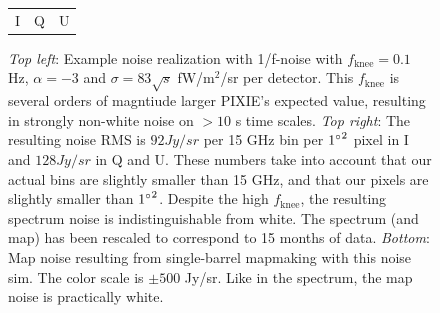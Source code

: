 \documentclass{article}
\begin{document}
\begin{figure}
\begin{tabular}{m{56mm}m{54.4mm}m{56mm}}
		\hspace{32mm}I & \hspace{32mm}Q & \hspace{32mm}U
	\end{tabular}
	\caption{\emph{Top left}: Example noise realization with 1/f-noise with
		$f_\textrm{knee} = 0.1$ Hz, $\alpha=-3$ and $\sigma = 83 \sqrt{s}$
		fW/$\textrm{m}^2$/sr per detector. This $f_\textrm{knee}$ is
		several orders of magntiude larger PIXIE's expected value,
		resulting in strongly non-white noise on $>10$ s time scales.
		\emph{Top right}: The resulting noise RMS is $92 Jy/sr$ per 15 GHz
		bin per ${1\degree}^2$ pixel in I and $128 Jy/sr$ in Q and U. These
		numbers take into account that our actual bins are slightly smaller than
		15 GHz, and that our pixels are slightly smaller than ${1\degree}^2$.
		Despite the high $f_\textrm{knee}$, the resulting spectrum noise is
		indistinguishable from white. The spectrum (and map) has been
		rescaled to correspond to 15 months of data. \emph{Bottom}: Map
		noise resulting from single-barrel mapmaking with this noise sim.
		The color scale is $\pm 500$ Jy/sr. Like in the spectrum, the map noise
		is practically white.}
\end{figure}
\end{document}
